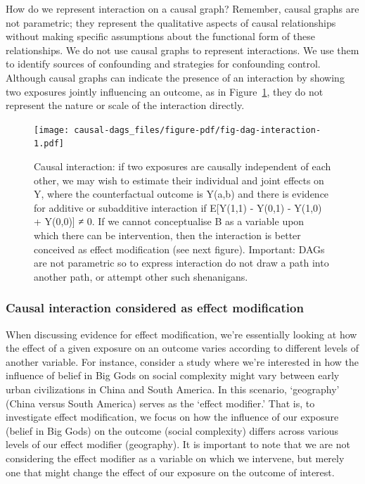 \documentclass[
  singlecolumn]{report}
\begin{document}
How do we represent interaction on a causal graph? Remember, causal
graphs are not parametric; they represent the qualitative aspects of
causal relationships without making specific assumptions about the
functional form of these relationships. We do not use causal graphs to
represent interactions. We use them to identify sources of confounding
and strategies for confounding control. Although causal graphs can
indicate the presence of an interaction by showing two exposures jointly
influencing an outcome, as in Figure~\ref{fig-dag-interaction}, they do
not represent the nature or scale of the interaction directly.

\begin{figure}

{\centering \texttt{[image: causal-dags\_files/figure-pdf/fig-dag-interaction-1.pdf]}

}

\caption{\label{fig-dag-interaction}Causal interaction: if two exposures
are causally independent of each other, we may wish to estimate their
individual and joint effects on Y, where the counterfactual outcome is
Y(a,b) and there is evidence for additive or subadditive interaction if
E{[}Y(1,1) - Y(0,1) - Y(1,0) + Y(0,0){]} ≠ 0. If we cannot conceptualise
B as a variable upon which there can be intervention, then the
interaction is better conceived as effect modification (see next
figure). Important: DAGs are not parametric so to express interaction do
not draw a path into another path, or attempt other such shenanigans.}

\end{figure}

\hypertarget{causal-interaction-considered-as-effect-modification}{%
\subsubsection{\texorpdfstring{\textbf{Causal interaction considered as
effect
modification}}{Causal interaction considered as effect modification}}\label{causal-interaction-considered-as-effect-modification}}

When discussing evidence for effect modification, we're essentially
looking at how the effect of a given exposure on an outcome varies
according to different levels of another variable. For instance,
consider a study where we're interested in how the influence of belief
in Big Gods on social complexity might vary between early urban
civilizations in China and South America. In this scenario, `geography'
(China versus South America) serves as the `effect modifier.' That is,
to investigate effect modification, we focus on how the influence of our
exposure (belief in Big Gods) on the outcome (social complexity) differs
across various levels of our effect modifier (geography). It is
important to note that we are not considering the effect modifier as a
variable on which we intervene, but merely one that might change the
effect of our exposure on the outcome of interest.
\end{document}
